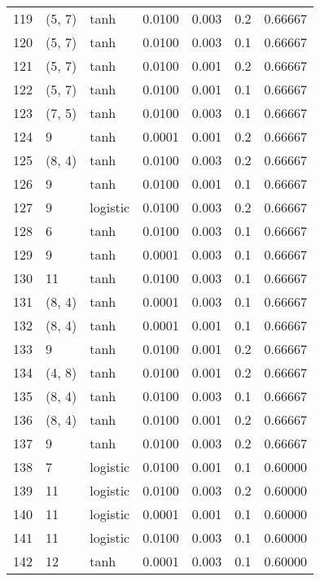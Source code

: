 \begin{tabular}{lllrrrr}
119 &      (5, 7) &      tanh &  0.0100 &  0.003 &  0.2 &   0.66667 \\
120 &      (5, 7) &      tanh &  0.0100 &  0.003 &  0.1 &   0.66667 \\
121 &      (5, 7) &      tanh &  0.0100 &  0.001 &  0.2 &   0.66667 \\
122 &      (5, 7) &      tanh &  0.0100 &  0.001 &  0.1 &   0.66667 \\
123 &      (7, 5) &      tanh &  0.0100 &  0.003 &  0.1 &   0.66667 \\
124 &           9 &      tanh &  0.0001 &  0.001 &  0.2 &   0.66667 \\
125 &      (8, 4) &      tanh &  0.0100 &  0.003 &  0.2 &   0.66667 \\
126 &           9 &      tanh &  0.0100 &  0.001 &  0.1 &   0.66667 \\
127 &           9 &  logistic &  0.0100 &  0.003 &  0.2 &   0.66667 \\
128 &           6 &      tanh &  0.0100 &  0.003 &  0.1 &   0.66667 \\
129 &           9 &      tanh &  0.0001 &  0.003 &  0.1 &   0.66667 \\
130 &          11 &      tanh &  0.0100 &  0.003 &  0.1 &   0.66667 \\
131 &      (8, 4) &      tanh &  0.0001 &  0.003 &  0.1 &   0.66667 \\
132 &      (8, 4) &      tanh &  0.0001 &  0.001 &  0.1 &   0.66667 \\
133 &           9 &      tanh &  0.0100 &  0.001 &  0.2 &   0.66667 \\
134 &      (4, 8) &      tanh &  0.0100 &  0.001 &  0.2 &   0.66667 \\
135 &      (8, 4) &      tanh &  0.0100 &  0.003 &  0.1 &   0.66667 \\
136 &      (8, 4) &      tanh &  0.0100 &  0.001 &  0.2 &   0.66667 \\
137 &           9 &      tanh &  0.0100 &  0.003 &  0.2 &   0.66667 \\
138 &           7 &  logistic &  0.0100 &  0.001 &  0.1 &   0.60000 \\
139 &          11 &  logistic &  0.0100 &  0.003 &  0.2 &   0.60000 \\
140 &          11 &  logistic &  0.0001 &  0.001 &  0.1 &   0.60000 \\
141 &          11 &  logistic &  0.0100 &  0.003 &  0.1 &   0.60000 \\
142 &          12 &      tanh &  0.0001 &  0.003 &  0.1 &   0.60000 \\

\end{tabular}
